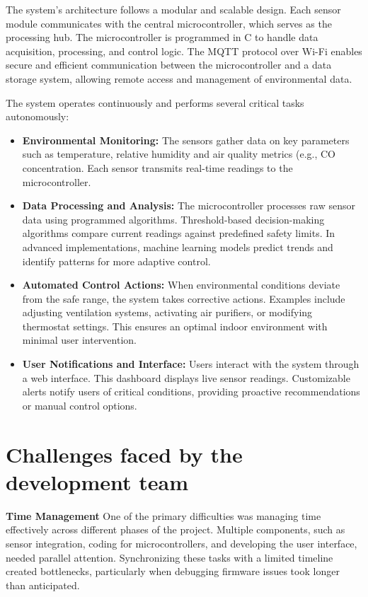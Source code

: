 \documentclass[USenglish,oneside,twocolumn]{article}
\begin{document}
The system's architecture follows a modular and scalable design. Each sensor module communicates with the central microcontroller, which serves as the processing hub. The microcontroller is programmed in C to handle data acquisition, processing, and control logic. The MQTT protocol over Wi-Fi enables secure and efficient communication between the microcontroller and a data storage system, allowing remote access and management of environmental data.

The system operates continuously and performs several critical tasks autonomously:
\begin{itemize}
\item \textbf{Environmental Monitoring:} The sensors gather data on key parameters such as temperature, relative humidity and air quality metrics (e.g., CO concentration. Each sensor transmits real-time readings to the microcontroller.
\item \textbf{Data Processing and Analysis:} The microcontroller processes raw sensor data using programmed algorithms. Threshold-based decision-making algorithms compare current readings against predefined safety limits. In advanced implementations, machine learning models predict trends and identify patterns for more adaptive control.
\item \textbf{Automated Control Actions:} When environmental conditions deviate from the safe range, the system takes corrective actions. Examples include adjusting ventilation systems, activating air purifiers, or modifying thermostat settings. This ensures an optimal indoor environment with minimal user intervention.
\item \textbf{User Notifications and Interface:} Users interact with the system through a web interface. This dashboard displays live sensor readings. Customizable alerts notify users of critical conditions, providing proactive recommendations or manual control options.
\end{itemize}

\section{Challenges faced by the development team}
\textbf{Time Management} One of the primary difficulties was managing time effectively across different phases of the project. Multiple components, such as sensor integration, coding for microcontrollers, and developing the user interface, needed parallel attention. Synchronizing these tasks with a limited timeline created bottlenecks, particularly when debugging firmware issues took longer than anticipated.
\end{document}
